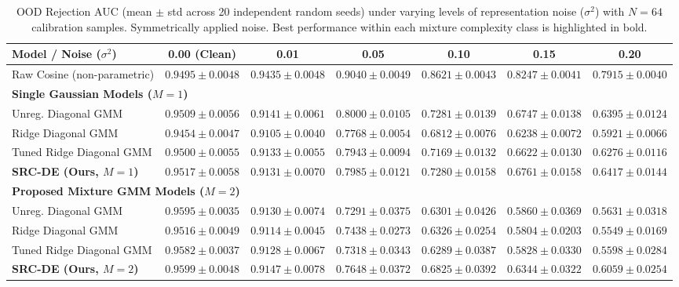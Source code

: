 \begin{table}[t]
\caption{OOD Rejection AUC (mean $\pm$ std across 20 independent random seeds) under varying levels of representation noise ($\sigma^2$) with $N=64$ calibration samples. Symmetrically applied noise. Best performance within each mixture complexity class is highlighted in bold.}
\label{submission:tab:robustness}
\vskip 0.15in
\begin{center}
\begin{small}
\begin{tabular}{lcccccc}
\toprule
Model / Noise ($\sigma^2$) & 0.00 (Clean) & 0.01 & 0.05 & 0.10 & 0.15 & 0.20 \\
\midrule
Raw Cosine (non-parametric) & $0.9495 \pm 0.0048$ & $0.9435 \pm 0.0048$ & $0.9040 \pm 0.0049$ & $0.8621 \pm 0.0043$ & $0.8247 \pm 0.0041$ & $0.7915 \pm 0.0040$ \\
\midrule
\multicolumn{7}{l}{\bf Single Gaussian Models ($M=1$)} \\
Unreg. Diagonal GMM & $0.9509 \pm 0.0056$ & \bf $0.9141 \pm 0.0061$ & \bf $0.8000 \pm 0.0105$ & \bf $0.7281 \pm 0.0139$ & $0.6747 \pm 0.0138$ & $0.6395 \pm 0.0124$ \\
Ridge Diagonal GMM & $0.9454 \pm 0.0047$ & $0.9105 \pm 0.0040$ & $0.7768 \pm 0.0054$ & $0.6812 \pm 0.0076$ & $0.6238 \pm 0.0072$ & $0.5921 \pm 0.0066$ \\
Tuned Ridge Diagonal GMM & $0.9500 \pm 0.0055$ & $0.9133 \pm 0.0055$ & $0.7943 \pm 0.0094$ & $0.7169 \pm 0.0132$ & $0.6622 \pm 0.0130$ & $0.6276 \pm 0.0116$ \\
\bf SRC-DE (Ours, $M=1$) & \bf $0.9517 \pm 0.0058$ & $0.9131 \pm 0.0070$ & $0.7985 \pm 0.0121$ & $0.7280 \pm 0.0158$ & \bf $0.6761 \pm 0.0158$ & \bf $0.6417 \pm 0.0144$ \\
\midrule
\multicolumn{7}{l}{\bf Proposed Mixture GMM Models ($M=2$)} \\
Unreg. Diagonal GMM & $0.9595 \pm 0.0035$ & $0.9130 \pm 0.0074$ & $0.7291 \pm 0.0375$ & $0.6301 \pm 0.0426$ & $0.5860 \pm 0.0369$ & $0.5631 \pm 0.0318$ \\
Ridge Diagonal GMM & $0.9516 \pm 0.0049$ & $0.9114 \pm 0.0045$ & $0.7438 \pm 0.0273$ & $0.6326 \pm 0.0254$ & $0.5804 \pm 0.0203$ & $0.5549 \pm 0.0169$ \\
Tuned Ridge Diagonal GMM & $0.9582 \pm 0.0037$ & $0.9128 \pm 0.0067$ & $0.7318 \pm 0.0343$ & $0.6289 \pm 0.0387$ & $0.5828 \pm 0.0330$ & $0.5598 \pm 0.0284$ \\
\bf SRC-DE (Ours, $M=2$) & \bf $0.9599 \pm 0.0048$ & \bf $0.9147 \pm 0.0078$ & \bf $0.7648 \pm 0.0372$ & \bf $0.6825 \pm 0.0392$ & \bf $0.6344 \pm 0.0322$ & \bf $0.6059 \pm 0.0254$ \\
\bottomrule
\end{tabular}
\end{small}
\end{center}
\vskip -0.1in
\end{table}

